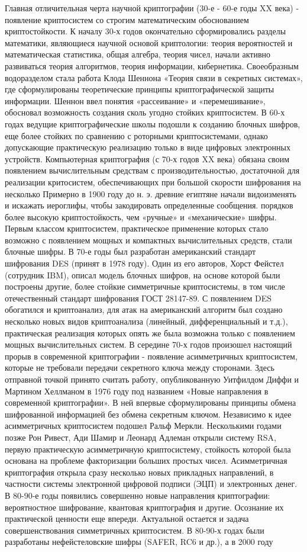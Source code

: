 Главная отличительная черта научной криптографии (30-е - 60-е годы XX века) - появление криптосистем со строгим математическим обоснованием криптостойкости. К началу 30-х годов окончательно сформировались разделы математики, являющиеся научной основой криптологии: теория вероятностей и математическая статистика, общая алгебра, теория чисел, начали активно развиваться теория алгоритмов, теория информации, кибернетика. Своеобразным водоразделом стала работа Клода Шеннона «Теория связи в секретных системах», где сформулированы теоретические принципы криптографической защиты информации. Шеннон ввел понятия «рассеивание» и «перемешивание», обосновал возможность создания сколь угодно стойких криптосистем. В 60-х годах ведущие криптографические школы подошли к созданию блочных шифров, еще более стойких по сравнению с роторными криптосистемами, однако допускающие практическую реализацию только в виде цифровых электронных устройств. Компьютерная криптография (с 70-х годов XX века) обязана своим появлением вычислительным средствам с производительностью, достаточной для реализации критосистем, обеспечивающих при большой скорости шифрования на несколько Примерно в 1900 году до н. э. древние египтяне начали видоизменять и искажать иероглифы, чтобы закодировать определенные сообщения. порядков более высокую криптостойкость, чем «ручные» и «механические» шифры. Первым классом криптосистем, практическое применение которых стало возможно с появлением мощных и компактных вычислительных средств, стали блочные шифры. В 70-е годы был разработан американский стандарт шифрования DES (принят в 1978 году). Один из его авторов, Хорст Фейстел (сотрудник IBM), описал модель блочных шифров, на основе которой были построены другие, более стойкие симметричные криптосистемы, в том числе отечественный стандарт шифрования ГОСТ 28147-89. С появлением DES обогатился и криптоанализ, для атак на американский алгоритм был создано несколько новых видов криптоанализа (линейный, дифференциальный и т.д.), практическая реализация которых опять же была возможна только с появлением мощных вычислительных систем. В середине 70-х годов произошел настоящий прорыв в современной криптографии - появление асимметричных криптосистем, которые не требовали передачи секретного ключа между сторонами. Здесь отправной точкой принято считать работу, опубликованную Уитфилдом Диффи и Мартином Хеллманом в 1976 году под названием «Новые направления в современной криптографии». В ней впервые сформулированы принципы обмена шифрованной информацией без обмена секретным ключом. Независимо к идее асимметричных криптосистем подошел Ральф Меркли. Несколькими годами позже Рон Ривест, Ади Шамир и Леонард Адлеман открыли систему RSA, первую практическую асимметричную криптосистему, стойкость которой была основана на проблеме факторизации больших простых чисел. Асимметричная криптография открыла сразу несколько новых прикладных направлений, в частности системы электронной цифровой подписи (ЭЦП) и электронных денег. В 80-90-е годы появились совершенно новые направления криптографии: вероятностное шифрование, квантовая криптография и другие. Осознание их практической ценности еще впереди. Актуальной остается и задача совершенствования симметричных криптосистем. В 80-90-х годах были разработаны нефейстеловские шифры (SAFER, RC6 и др.), а в 2000 году 